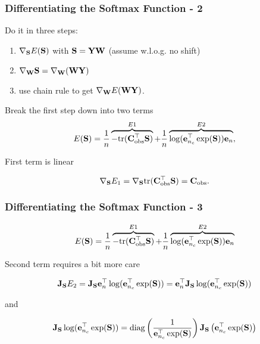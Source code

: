 \documentclass[12pt,fleqn,handout]{beamer}
\begin{document}
\begin{frame}[fragile]\frametitle{Differentiating the Softmax Function - 2}

Do it in three steps:
\begin{enumerate}
	\item $\nabla_{{\bf S}} E({\bf S})$ with ${\bf S} = {\bf Y} {\bf W}$ (assume w.l.o.g. no shift)
	\item $\nabla_{{\bf W}} {\bf S} = \nabla_{{\bf W}} ({\bf W} {\bf Y})$
	\item use chain rule to get $\nabla_{{\bf W}} E({\bf W}{\bf Y})$.
\end{enumerate}

\bigskip
\pause

Break the first step down into two terms
$$ E({\bf S}) = \frac{1}{n} \overbrace{-{\rm tr}({\bf C}_{\rm obs}^{\top} {\bf S})}^{E1} + \frac{1}{n} \overbrace{\log({\bf e}_{n_c}^\top\exp({\bf S})){\bf e}_n}^{E2}, $$


\bigskip
\pause

First term is linear

$$\nabla_{{\bf S}}E_1 =  \nabla_{{\bf S}} {\rm tr}({\bf C}_{\rm obs}^{\top} {\bf S}) = {\bf C}_{\rm obs}. $$

\end{frame}

\begin{frame}[fragile]\frametitle{Differentiating the Softmax Function - 3}


$$ E({\bf S}) = \frac{1}{n}\overbrace{-{\rm tr}({\bf C}_{\rm obs}^{\top} {\bf S})}^{E1} + \frac{1}{n} \overbrace{\log({\bf e}_{n_c}^\top\exp({\bf S})){\bf e}_n}^{E2}  $$


\bigskip

Second  term requires a bit more care

$$ {\bf J}_{{\bf S}}E_2 = {\bf J}_{{\bf S}} {\bf e}_n^{\top}\log({\bf e}_{n_c}^\top \exp({\bf S})) = 
 {\bf e}_n^{\top}{\bf J}_{{\bf S}}  \log({\bf e}_{n_c}^\top\exp({\bf S}))  $$

\pause 
 and
 
$$ {\bf J}_{{\bf S}}  \log({\bf e}_{n_c}^\top\exp({\bf S})) = {\rm diag}
\left( {\frac {1}{{\bf e}_{n_c}^\top\exp({\bf S})}}\right)
{\bf J}_{{\bf S}}\left({\bf e}_{n_c}^\top\exp({\bf S}) \right) $$
 

\end{frame}
\end{document}
